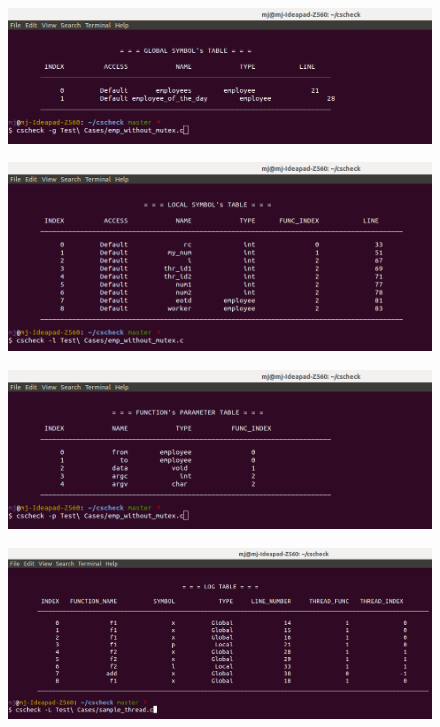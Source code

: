 \begin{figure}[H]
\centering
\includegraphics[scale=0.4]{Snaps/util_13-14_out1.png}
\label{<<Label>>}
\end{figure}
\begin{figure}[H]
\centering
\includegraphics[scale=0.4]{Snaps/util_13-14_out2.png}
\label{<<Label>>}
\end{figure}
\begin{figure}[H]
\centering
\includegraphics[scale=0.4]{Snaps/util_2_out.png}
\label{<<Label>>}
\end{figure}

\begin{figure}[H]
\centering
\includegraphics[scale=0.4]{Snaps/util_3_out.png}
\label{<<Label>>}
\end{figure}

